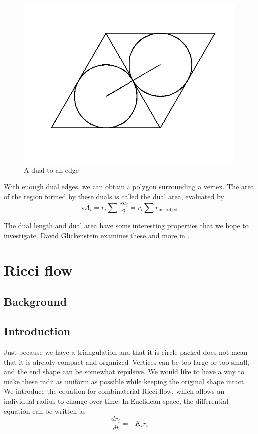 \documentclass[12pt]{article}
\begin{document}
\begin{figure}
\centering
\includegraphics[scale = 0.4]{dual.png}
\caption{A dual to an edge}
\label{fig:dual}
\end{figure}

\noindent With enough dual edges, we can obtain a polygon surrounding a vertex. The area of the region formed by these duals is called the dual area, evaluated by $$\star A_i = r_i\sum{\frac{\star e_i}{2}} = r_i\sum{r_{\mbox{inscribed}}}$$

\noindent The dual length and dual area have some interesting properties that we hope to investigate. David Glickenstein examines these and more in \cite{Dave}.  

\section{Ricci flow}
\subsection{Background}

\subsection{Introduction}

Just because we have a triangulation and that it is circle packed does not mean that it is already compact and organized. Vertices can be too large or too small, and the end shape can be somewhat repulsive. We would like to have a way to make these radii as uniform as possible while keeping the original shape intact. We introduce the equation for combinatorial Ricci flow, which allows an individual radius to change over time. In Euclidean space, the differential equation can be written as 
  \begin{equation}
  \label{Riccif}
  \frac{dr_i}{{dt}} = -K_ir_i
  \end{equation}
  
\end{document}
